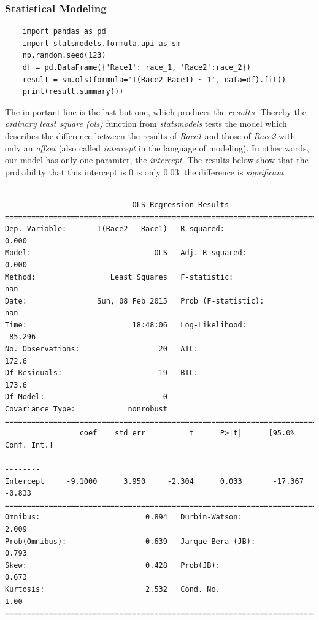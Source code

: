 \subsubsection{Statistical Modeling}

\begin{lstlisting}
    import pandas as pd
    import statsmodels.formula.api as sm
    np.random.seed(123)
    df = pd.DataFrame({'Race1': race_1, 'Race2':race_2})
    result = sm.ols(formula='I(Race2-Race1) ~ 1', data=df).fit()
    print(result.summary())
\end{lstlisting}

The important line is the last but one, which produces the $results$. Thereby the \emph{ordinary least square (ols)} function from \emph{statsmodels} tests the model which describes the difference between the results of \emph{Race1} and those of \emph{Race2} with only an \emph{offset} (also called \emph{intercept} in the language of modeling). In other words, our model has only one paramter, the \emph{intercept}. The results below show that the probability that this intercept is 0 is only 0.03: the difference is \emph{significant}.

 \small\begin{lstlisting}

                             OLS Regression Results
==============================================================================
Dep. Variable:       I(Race2 - Race1)   R-squared:                       0.000
Model:                            OLS   Adj. R-squared:                  0.000
Method:                 Least Squares   F-statistic:                       nan
Date:                Sun, 08 Feb 2015   Prob (F-statistic):                nan
Time:                        18:48:06   Log-Likelihood:                -85.296
No. Observations:                  20   AIC:                             172.6
Df Residuals:                      19   BIC:                             173.6
Df Model:                           0
Covariance Type:            nonrobust
==============================================================================
                 coef    std err          t      P>|t|      [95.0% Conf. Int.]
------------------------------------------------------------------------------
Intercept     -9.1000      3.950     -2.304      0.033       -17.367    -0.833
==============================================================================
Omnibus:                        0.894   Durbin-Watson:                   2.009
Prob(Omnibus):                  0.639   Jarque-Bera (JB):                0.793
Skew:                           0.428   Prob(JB):                        0.673
Kurtosis:                       2.532   Cond. No.                         1.00
==============================================================================
\end{lstlisting}
\normalsize

